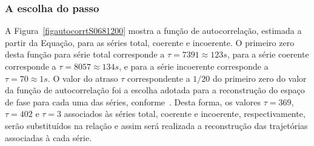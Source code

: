 \subsubsection{A escolha do passo}
A Figura~\ref{figautocorrtS0681200} mostra a função de autocorrelação, estimada a partir da Equação,%
para as séries total, coerente e incoerente. O primeiro zero desta função para série total corresponde a $\tau=7391\approx 123s$, para a série coerente corresponde a $\tau=8057\approx 134s$, e para a série incoerente corresponde a $\tau=70\approx 1s$. O valor do atraso $\tau$ correspondente a $1/20$ do primeiro zero do valor da função de autocorrelação foi a escolha adotada para a reconstrução do espaço de fase para cada uma das séries, conforme~. Desta forma, os valores $\tau=369$, $\tau=402$ e $\tau=3$ associados às séries total, coerente e incoerente, respectivamente, serão substituídos na relação%
e assim será realizada a reconstrução das trajetórias associadas à cada série. 


